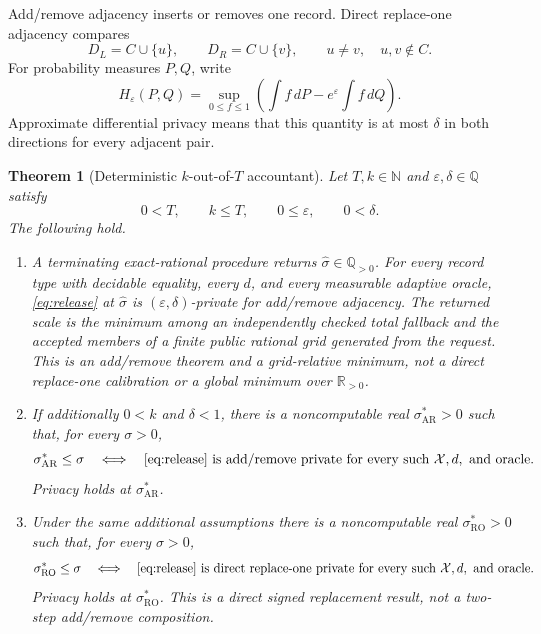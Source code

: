 \documentclass[11pt]{article}
\newtheorem{theorem}{Theorem}[section]
\theoremstyle{remark}
\newcommand{\R}{\mathbb{R}}
\newcommand{\Q}{\mathbb{Q}}
\newcommand{\N}{\mathbb{N}}
\begin{document}
Add/remove adjacency inserts or removes one record.  Direct replace-one
adjacency compares
\[
 D_L=C\cup\{u\},\qquad D_R=C\cup\{v\},
 \qquad u\neq v,\quad u,v\notin C.
\]
For probability measures $P,Q$, write
\[
 H_\varepsilon(P,Q)
 =\sup_{0\leq f\leq1}
   \left(\int f\,dP-e^\varepsilon\int f\,dQ\right).
\]
Approximate differential privacy means that this quantity is at most
$\delta$ in both directions for every adjacent pair.

\begin{theorem}[Deterministic $k$-out-of-$T$ accountant]\label{thm:main}
Let $T,k\in\N$ and $\varepsilon,\delta\in\Q$ satisfy
\[
 0<T,\qquad k\leq T,\qquad 0\leq\varepsilon,\qquad 0<\delta.
\]
The following hold.
\begin{enumerate}[label=\textup{(\roman*)},leftmargin=2.4em]
\item A terminating exact-rational procedure returns
  $\widehat\sigma\in\Q_{>0}$.  For every record type with decidable equality,
  every $d$, and every measurable adaptive oracle, \eqref{eq:release} at
  $\widehat\sigma$ is $(\varepsilon,\delta)$-private for add/remove adjacency.
  The returned scale is the minimum among an independently checked total
  fallback and the accepted members of a finite public rational grid generated
  from the request.
  This is an add/remove theorem and a grid-relative minimum, not a direct
  replace-one calibration or a global minimum over $\R_{>0}$.

\item If additionally $0<k$ and $\delta<1$, there is a noncomputable real
  $\sigma_{\mathrm{AR}}^*>0$ such that, for every $\sigma>0$,
  \[
    \sigma_{\mathrm{AR}}^*\leq\sigma
    \quad\Longleftrightarrow\quad
    \eqref{eq:release}\text{ is add/remove private for every such }
    \mathcal X,d,\text{ and oracle}.
  \]
  Privacy holds at $\sigma_{\mathrm{AR}}^*$.

\item Under the same additional assumptions there is a noncomputable real
  $\sigma_{\mathrm{RO}}^*>0$ such that, for every $\sigma>0$,
  \[
    \sigma_{\mathrm{RO}}^*\leq\sigma
    \quad\Longleftrightarrow\quad
    \eqref{eq:release}\text{ is direct replace-one private for every such }
    \mathcal X,d,\text{ and oracle}.
  \]
  Privacy holds at $\sigma_{\mathrm{RO}}^*$.  This is a direct signed
  replacement result, not a two-step add/remove composition.
\end{enumerate}
\end{theorem}
\end{document}
